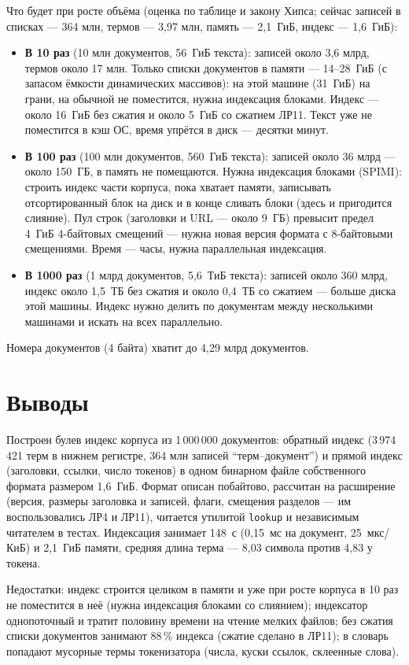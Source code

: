 Что будет при росте объёма (оценка по таблице и закону Хипса; сейчас записей в списках --- 364 млн, термов --- 3,97 млн, память --- 2,1~ГиБ, индекс --- 1,6~ГиБ):
\begin{itemize}
    \item \textbf{В 10 раз} (10 млн документов, 56~ГиБ текста): записей около 3,6 млрд, термов около 17 млн. Только списки документов в памяти --- 14--28~ГиБ (с запасом ёмкости динамических массивов): на этой машине (31~ГиБ) на грани, на обычной не поместится, нужна индексация блоками. Индекс --- около 16~ГиБ без сжатия и около 5~ГиБ со сжатием ЛР11. Текст уже не поместится в кэш ОС, время упрётся в диск --- десятки минут.
    \item \textbf{В 100 раз} (100 млн документов, 560~ГиБ текста): записей около 36 млрд --- около 150~ГБ, в память не помещаются. Нужна индексация блоками (SPIMI): строить индекс части корпуса, пока хватает памяти, записывать отсортированный блок на диск и в конце сливать блоки (здесь и пригодится слияние). Пул строк (заголовки и URL --- около 9~ГБ) превысит предел 4~ГиБ 4-байтовых смещений --- нужна новая версия формата с 8-байтовыми смещениями. Время --- часы, нужна параллельная индексация.
    \item \textbf{В 1000 раз} (1 млрд документов, 5,6~ТиБ текста): записей около 360 млрд, индекс около 1,5~ТБ без сжатия и около 0,4~ТБ со сжатием --- больше диска этой машины. Индекс нужно делить по документам между несколькими машинами и искать на всех параллельно.
\end{itemize}
Номера документов (4 байта) хватит до 4,29 млрд документов.

\section{Выводы}
Построен булев индекс корпуса из 1\,000\,000 документов: обратный индекс (3\,974\,421 терм в нижнем регистре, 364 млн записей \enquote{терм--документ}) и прямой индекс (заголовки, ссылки, число токенов) в одном бинарном файле собственного формата размером 1,6~ГиБ. Формат описан побайтово, рассчитан на расширение (версия, размеры заголовка и записей, флаги, смещения разделов --- им воспользовались ЛР4 и ЛР11), читается утилитой \texttt{lookup} и независимым читателем в тестах. Индексация занимает 148~с (0,15~мс на документ, 25~мкс/КиБ) и 2,1~ГиБ памяти, средняя длина терма --- 8,03 символа против 4,83 у токена.

Недостатки: индекс строится целиком в памяти и уже при росте корпуса в 10 раз не поместится в неё (нужна индексация блоками со слиянием); индексатор однопоточный и тратит половину времени на чтение мелких файлов; без сжатия списки документов занимают 88\,\% индекса (сжатие сделано в ЛР11); в словарь попадают мусорные термы токенизатора (числа, куски ссылок, склеенные слова).
